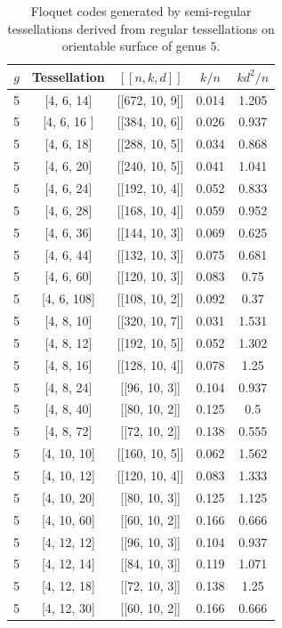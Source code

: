\documentclass[%
reprint,
amsmath,amssymb,
aps,
]{revtex4-2}
\begin{document}
\begin{table}[b]
	\caption{\label{og5}
		Floquet codes generated by semi-regular tessellations derived from regular tessellations on orientable surface of genus $5$.}
	\begin{ruledtabular}
		\begin{tabular}{|c|c|c|c|c|}
			$g$ & Tessellation & $[[n,k,d]]$ & $k/n$ & $kd^{2}/n$ \\ \hline
	5 & [4, 6, 14] & [[672, 10, 9]] & 0.014 & 1.205   \\
	5 & [4, 6, 16 ] & [[384, 10, 6]] & 0.026 & 0.937  \\
	5 & [4, 6, 18] & [[288, 10, 5]] & 0.034 & 0.868  \\
	5 & [4, 6, 20] & [[240, 10, 5]] & 0.041 & 1.041   \\
	5 & [4, 6, 24] & [[192, 10, 4]] & 0.052 & 0.833  \\
	5 & [4, 6, 28] & [[168, 10, 4]] & 0.059 & 0.952   \\
	5 & [4, 6, 36] & [[144, 10, 3]] & 0.069 & 0.625   \\
	5 & [4, 6, 44] & [[132, 10, 3]] & 0.075 & 0.681  \\
	5 & [4, 6, 60] & [[120, 10, 3]] & 0.083 & 0.75   \\
	5 & [4, 6, 108] & [[108, 10, 2]] & 0.092 & 0.37  \\
	5 & [4, 8, 10] & [[320, 10, 7]] & 0.031 & 1.531  \\
	5 & [4, 8, 12] & [[192, 10, 5]] & 0.052 & 1.302  \\
	5 & [4, 8, 16] & [[128, 10, 4]] & 0.078 & 1.25  \\
	5 & [4, 8, 24] & [[96, 10, 3]] & 0.104 & 0.937  \\
	5 & [4, 8, 40] & [[80, 10, 2]] & 0.125 & 0.5  \\
	5 & [4, 8, 72] & [[72, 10, 2]] & 0.138 & 0.555  \\
	5 & [4, 10, 10] & [[160, 10, 5]] & 0.062 & 1.562  \\
	5 & [4, 10, 12] & [[120, 10, 4]] & 0.083 & 1.333  \\
	5 & [4, 10, 20] & [[80, 10, 3]] & 0.125 & 1.125  \\
	5 & [4, 10, 60] & [[60, 10, 2]] & 0.166 & 0.666  \\
	5 & [4, 12, 12] & [[96, 10, 3]] & 0.104 & 0.937  \\
	5 & [4, 12, 14] & [[84, 10, 3]] & 0.119 & 1.071  \\
	5 & [4, 12, 18] & [[72, 10, 3]] & 0.138 & 1.25  \\
	5 & [4, 12, 30] & [[60, 10, 2]] & 0.166 & 0.666  \\

\end{tabular}
\end{ruledtabular}
\end{table}
\end{document}
